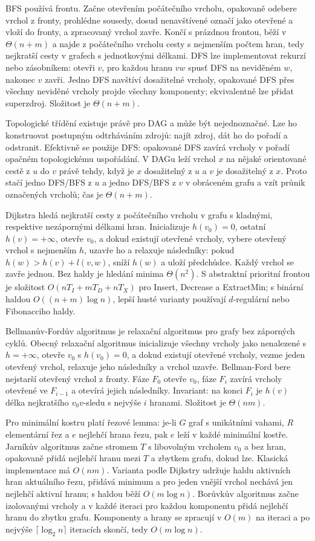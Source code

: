 \begin{odpoved}
BFS používá frontu. Začne otevřením počátečního vrcholu, opakovaně odebere vrchol z
fronty, prohlédne sousedy, dosud nenavštívené označí jako otevřené a vloží do fronty, a
zpracovaný vrchol zavře. Končí s prázdnou frontou, běží v $\Theta(n+m)$ a najde z
počátečního vrcholu cesty s nejmenším počtem hran, tedy nejkratší cesty v grafech s
jednotkovými délkami. DFS lze implementovat rekurzí nebo zásobníkem:
otevři $v$, pro každou hranu $vw$ spusť DFS na neviděném $w$, nakonec $v$ zavři.
Jedno DFS navštíví dosažitelné vrcholy, opakované DFS přes všechny neviděné vrcholy
projde všechny komponenty; ekvivalentně lze přidat superzdroj. Složitost je
$\Theta(n+m)$.

Topologické třídění existuje právě pro DAG a může být nejednoznačné. Lze ho konstruovat
postupným odtrháváním zdrojů: najít zdroj, dát ho do pořadí a odstranit. Efektivně se
použije DFS: opakované DFS zavírá vrcholy v pořadí opačném topologickému uspořádání.
V DAGu leží vrchol $x$ na nějaké orientované cestě z $u$ do $v$ právě tehdy, když je
$x$ dosažitelný z $u$ a $v$ je dosažitelný z $x$. Proto stačí jedno DFS/BFS z $u$ a
jedno DFS/BFS z $v$ v obráceném grafu a vzít průnik označených vrcholů; čas je
$\Theta(n+m)$.

Dijkstra hledá nejkratší cesty z počátečního vrcholu v grafu s kladnými, respektive
nezápornými délkami hran. Inicializuje $h(v_0)=0$, ostatní $h(v)=+\infty$, otevře
$v_0$, a dokud existují otevřené vrcholy, vybere otevřený vrchol s nejmenším $h$,
uzavře ho a relaxuje následníky: pokud $h(w)>h(v)+l(v,w)$, sníží $h(w)$ a uloží
předchůdce. Každý vrchol se zavře jednou. Bez haldy je hledání minima
$\Theta(n^2)$. S abstraktní prioritní frontou je složitost
$O(nT_I+mT_D+nT_X)$ pro Insert, Decrease a ExtractMin; s binární haldou
$O((n+m)\log n)$, lepší husté varianty používají $d$-regulární nebo Fibonacciho haldy.

Bellmanův-Fordův algoritmus je relaxační algoritmus pro grafy bez záporných cyklů.
Obecný relaxační algoritmus inicializuje všechny vrcholy jako nenalezené s
$h=+\infty$, otevře $v_0$ s $h(v_0)=0$, a dokud existují otevřené vrcholy, vezme jeden
otevřený vrchol, relaxuje jeho následníky a vrchol uzavře. Bellman-Ford bere nejstarší
otevřený vrchol z fronty. Fáze $F_0$ otevře $v_0$, fáze $F_i$ zavírá vrcholy otevřené ve
$F_{i-1}$ a otevírá jejich následníky. Invariant: na konci $F_i$ je $h(v)$ délka
nejkratšího $v_0v$-sledu s nejvýše $i$ hranami. Složitost je $\Theta(nm)$.

Pro minimální kostru platí řezové lemma: je-li $G$ graf s unikátními vahami, $R$
elementární řez a $e$ nejlehčí hrana řezu, pak $e$ leží v každé minimální kostře.
Jarníkův algoritmus začne stromem $T$ s libovolným vrcholem $v_0$ a bez hran, opakovaně
přidá nejlehčí hranu mezi $T$ a zbytkem grafu, dokud lze. Klasická implementace má
$O(nm)$. Varianta podle Dijkstry udržuje haldu aktivních hran aktuálního řezu, přidává
minimum a pro jeden vnější vrchol nechává jen nejlehčí aktivní hranu; s haldou běží
$O(m\log n)$. Borůvkův algoritmus začne izolovanými vrcholy a v každé iteraci pro
každou komponentu přidá nejlehčí hranu do zbytku grafu. Komponenty a hrany se zpracují
v $O(m)$ na iteraci a po nejvýše $\lceil\log_2 n\rceil$ iteracích skončí, tedy
$O(m\log n)$.


\end{odpoved}
